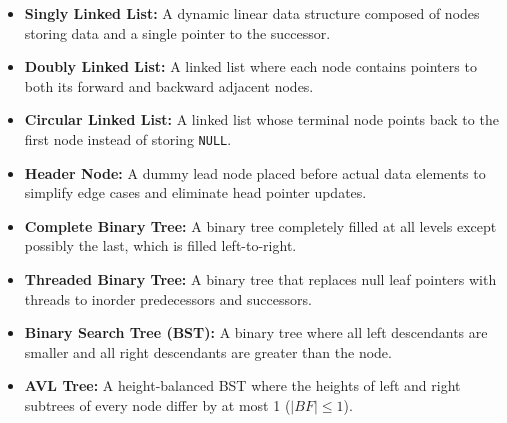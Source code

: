 \documentclass[12pt,a4paper]{article}
\begin{document}
\begin{tcolorbox}[defbox, title={\textbf{One-Line Definitions}}]
\begin{itemize}[leftmargin=*, itemsep=2pt, topsep=0pt]
  \item \textbf{Singly Linked List:} A dynamic linear data structure composed of nodes storing data and a single pointer to the successor.
  \item \textbf{Doubly Linked List:} A linked list where each node contains pointers to both its forward and backward adjacent nodes.
  \item \textbf{Circular Linked List:} A linked list whose terminal node points back to the first node instead of storing \texttt{NULL}.
  \item \textbf{Header Node:} A dummy lead node placed before actual data elements to simplify edge cases and eliminate head pointer updates.
  \item \textbf{Complete Binary Tree:} A binary tree completely filled at all levels except possibly the last, which is filled left-to-right.
  \item \textbf{Threaded Binary Tree:} A binary tree that replaces null leaf pointers with threads to inorder predecessors and successors.
  \item \textbf{Binary Search Tree (BST):} A binary tree where all left descendants are smaller and all right descendants are greater than the node.
  \item \textbf{AVL Tree:} A height-balanced BST where the heights of left and right subtrees of every node differ by at most 1 ($|BF| \le 1$).
\end{itemize}
\end{tcolorbox}

\newpage
\end{document}
